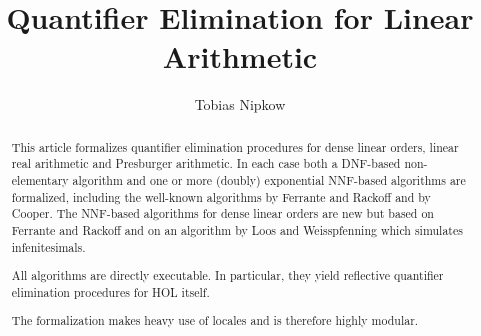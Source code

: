 \documentclass[11pt,a4paper]{article}
\begin{document}
\title{Quantifier Elimination for Linear Arithmetic}
\author{Tobias Nipkow}
\maketitle

\begin{abstract}
This article formalizes quantifier elimination procedures for dense
linear orders, linear real arithmetic and Presburger arithmetic.  In
each case both a DNF-based non-elementary algorithm and one or more
(doubly) exponential NNF-based algorithms are formalized, including
the well-known algorithms by Ferrante and Rackoff and by Cooper. The
NNF-based algorithms for dense linear orders are new but based on
Ferrante and Rackoff and on an algorithm by Loos and Weisspfenning
which simulates infenitesimals.

All algorithms are directly executable. In particular, they yield
reflective quantifier elimination procedures for HOL itself.

The formalization makes heavy use of locales and is therefore highly modular.
\end{abstract}

\tableofcontents





\end{document}
